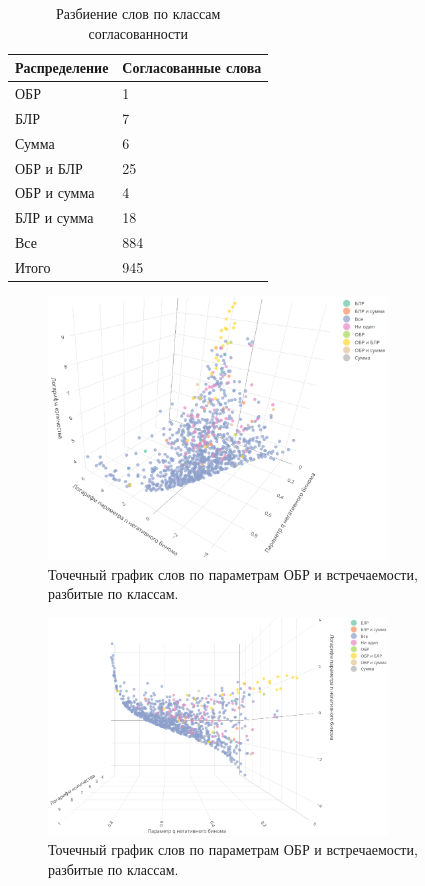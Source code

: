 \documentclass[12pt, specialist, subf, substylefile = spbu.rtx]{disser}
\begin{document}
	\begin{table}[t]
		\centering
		\caption{Разбиение слов по классам согласованности}
		\begin{tabular}{l|l}
			Распределение 		   & Согласованные слова \\
			\hline
			ОБР                    & 1               \\
			БЛР                    & 7               \\
			Сумма                  & 6              \\
			ОБР и БЛР              & 25              \\
			ОБР и сумма            & 4              \\
			БЛР и сумма            & 18              \\
			Все                    & 884             \\
			\hline
			Итого                  & 945          
		\end{tabular}
		\label{tab:wordclass}
	\end{table}

	\begin{figure}[!ht]
		\centering
		\includegraphics[width = 0.8\textwidth]{wordclassmain}
		\caption{Точечный график слов по параметрам ОБР и встречаемости, разбитые по классам.}
		\label{img:wordclassmain}
	\end{figure}
	
	\begin{figure}[!ht]
		\centering
		\includegraphics[width = 0.8\textwidth]{wordclassup}
		\caption{Точечный график слов по параметрам ОБР и встречаемости, разбитые по классам.}
		\label{img:wordclassup}
	\end{figure}
\end{document}

